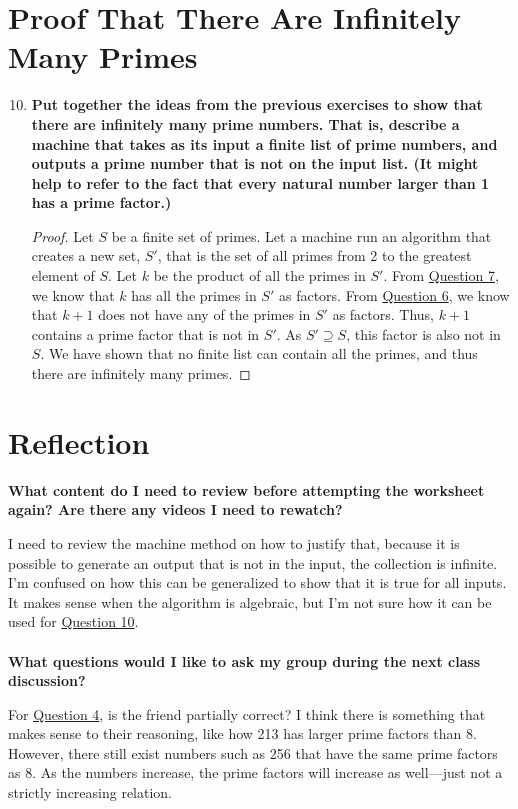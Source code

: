 \documentclass[article, 12pt]{article}
\theoremstyle{definition}
\begin{document}
    \section{Proof That There Are Infinitely Many Primes}
    \begin{enumerate}[(1)]
        \setcounter{enumi}{9}
        \item \textbf{Put together the ideas from the previous exercises to show that there are infinitely many prime numbers. That is, describe a machine that takes as its input a finite list of prime numbers, and outputs a prime number that is not on the input list. (It might help to refer to the fact that every natural number larger than 1 has a prime factor.)}\label{question:prove infinitely many primes}
        \begin{proof}
            Let $S$ be a finite set of primes. Let a machine run an algorithm that creates a new set, $S'$, that is the set of all primes from 2 to the greatest element of $S$. Let $k$ be the product of all the primes in $S'$. From \hyperref[question:produce k]{Question 7}, we know that $k$ has all the primes in $S'$ as factors. From \hyperref[question:k + 1 cannot have n as a factor]{Question 6}, we know that $k+1$ does not have any of the primes in $S'$ as factors. Thus, $k+1$ contains a prime factor that is not in $S'$. As $S' \supseteq S$, this factor is also not in $S$. We have shown that no finite list can contain all the primes, and thus there are infinitely many primes.
        \end{proof}
    \end{enumerate}
    \section{Reflection}
        \textbf{What content do I need to review before attempting the worksheet again? Are there any videos I need to rewatch?}
        
        I need to review the machine method on how to justify that, because it is possible to generate an output that is not in the input, the collection is infinite. I'm confused on how this can be generalized to show that it is true for all inputs. It makes sense when the algorithm is algebraic, but I'm not sure how it can be used for \hyperref[question:prove infinitely many primes]{Question 10}.
        \\
        \\
        \textbf{What questions would I like to ask my group during the next class discussion?}

        For \hyperref[question:friend]{Question 4}, is the friend partially correct? I think there is something that makes sense to their reasoning, like how 213 has larger prime factors than 8. However, there still exist numbers such as 256 that have the same prime factors as 8. As the numbers increase, the prime factors will increase as well---just not a strictly increasing relation. 
\end{document}
